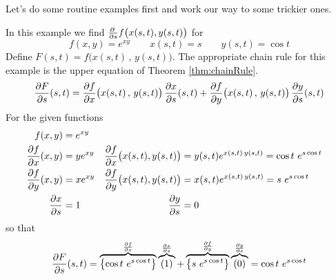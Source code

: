 Let's do some routine examples first and work our way to some trickier
ones.


\begin{eg}\label{eg:chainRuleAA}
In this example we find $\pdiff{}{s}f\big(x(s,t),y(s,t)\big)$ for 
\begin{equation*}
f(x,y)=e^{xy}\qquad x(s,t)=s \qquad y(s,t)=\cos t
\end{equation*}
Define $F(s,t)=f\big(x(s,t)\,,\,y(s,t)\big)$. The appropriate chain rule for this 
example is the upper equation of Theorem \ref{thm:chainRule}.
\begin{equation*}
\pdiff{F}{s}(s,t)
=  \pdiff{f}{x}\big(x(s,t)\,,\,y(s,t)\big)\, \pdiff{x}{s}(s,t)
   +\pdiff{f}{y}\big(x(s,t)\,,\,y(s,t)\big)\, \pdiff{y}{s}(s,t)
\end{equation*}
For the given functions
\begin{align*}
f(x,y)&=e^{xy}  \\
\pdiff{f}{x}(x,y)&= ye^{xy}  &
\pdiff{f}{x}\big(x(s,t),y(s,t)\big)&= y(s,t) e^{x(s,t)\,y(s,t)}
                                    = \cos t\ e^{s\cos t} \\
\pdiff{f}{y}(x,y)&= xe^{xy}  &
\pdiff{f}{y}\big(x(s,t),y(s,t)\big)&= x(s,t) e^{x(s,t)\,y(s,t)}
                                    = s\ e^{s\cos t} \\
\pdiff{x}{s}&=1 &
\pdiff{y}{s}&=0  
\end{align*}
so that 
$$
\pdiff{F}{s}(s,t)=\overbrace{\left\{\cos t\ e^{s\cos t}\right\}}^{\pdiff{f}{x}}
                  \overbrace{(1) }^{\pdiff{x}{s}}
                  +\overbrace{\left\{s\ e^{s\cos t}\right\}}^{\pdiff{f}{y}}
                    \overbrace{(0) }^{\pdiff{y}{s}}
                 = \cos t\ e^{s\cos t}
$$

\end{eg}

